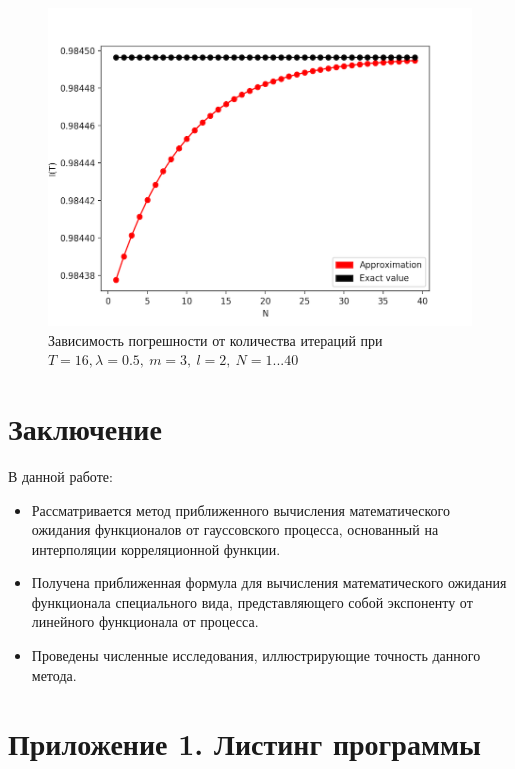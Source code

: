 \documentclass [a4paper, 12pt]{report}
\begin{document}
\begin{figure}
\begin{center}
\includegraphics{n_dependency.png}
\end{center}
\caption{Зависимость погрешности от количества
итераций при $T=16, \lambda=0.5,~m=3, ~l=2, ~N=1...40$}
\end{figure}

\chapter*{Заключение}
В данной работе:
\begin{itemize}
\item Рассматривается метод приближенного вычисления математического ожидания функционалов от гауссовского процесса, основанный на интерполяции корреляционной функции.
\item Получена приближенная формула для вычисления математического ожидания функционала специального вида, представляющего собой экспоненту от линейного функционала от процесса.
\item Проведены численные исследования, иллюстрирующие точность данного метода.
\end{itemize}

\chapter*{Приложение 1. Листинг программы}
\end{document}
